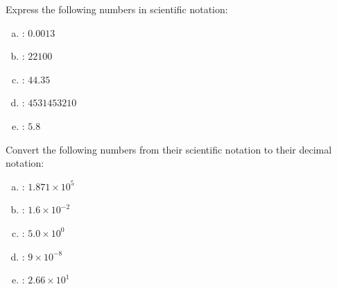 \documentclass[11pt,letterpaper]{article}
\begin{document}
\vfill



 Express the following numbers in scientific notation: \pvspace{0.2cm}
\begin{enumerate}[(a)] \itemsep=2ex
\item \uans{6cm}: \qquad $0.0013$
\item \uans{6cm}: \qquad $22100$
\item \uans{6cm}: \qquad $44.35$
\item \uans{6cm}: \qquad $4531453210$
\item \uans{6cm}: \qquad $5.8$
\end{enumerate}



\vfill



 Convert the following numbers from their scientific notation to their decimal notation: \pvspace{0.2cm}
\begin{enumerate}[(a)] \itemsep=2ex
\item \uans{6cm}: \qquad $1.871 \times 10^5$
\item \uans{6cm}: \qquad $1.6 \times 10^{-2}$
\item \uans{6cm}: \qquad $5.0 \times 10^0$
\item \uans{6cm}: \qquad $9 \times 10^{-8}$
\item \uans{6cm}: \qquad $2.66 \times 10^1$ 
\end{enumerate}


\end{document}
